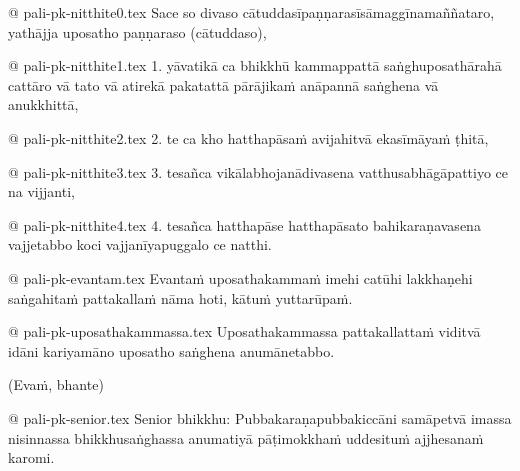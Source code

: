 @ pali-pk-nitthite0.tex
Sace so divaso cātuddasīpaṇṇarasīsāmaggīnamaññataro, yathājja uposatho paṇṇaraso (cātuddaso),

@ pali-pk-nitthite1.tex
1. yāvatikā ca bhikkhū kammappattā saṅghuposathārahā cattāro vā tato vā atirekā pakatattā pārājikaṁ anāpannā saṅghena vā anukkhittā,

@ pali-pk-nitthite2.tex
2. te ca kho hatthapāsaṁ avijahitvā ekasīmāyaṁ ṭhitā,

@ pali-pk-nitthite3.tex
3. tesañca vikālabhojanādivasena vatthusabhāgāpattiyo ce na vijjanti,

@ pali-pk-nitthite4.tex
4. tesañca hatthapāse hatthapāsato bahikaraṇavasena vajjetabbo koci vajjanīyapuggalo ce natthi.

@ pali-pk-evantam.tex
Evantaṁ uposathakammaṁ imehi catūhi lakkhaṇehi saṅgahitaṁ pattakallaṁ nāma hoti, kātuṁ yuttarūpaṁ.

@ pali-pk-uposathakammassa.tex
Uposathakammassa pattakallattaṁ viditvā idāni kariyamāno uposatho saṅghena anumānetabbo.

(Evaṁ, bhante)

@ pali-pk-senior.tex
Senior bhikkhu: Pubbakaraṇapubbakiccāni samāpetvā imassa nisinnassa bhikkhusaṅghassa anumatiyā pāṭimokkhaṁ uddesituṁ ajjhesanaṁ karomi.
